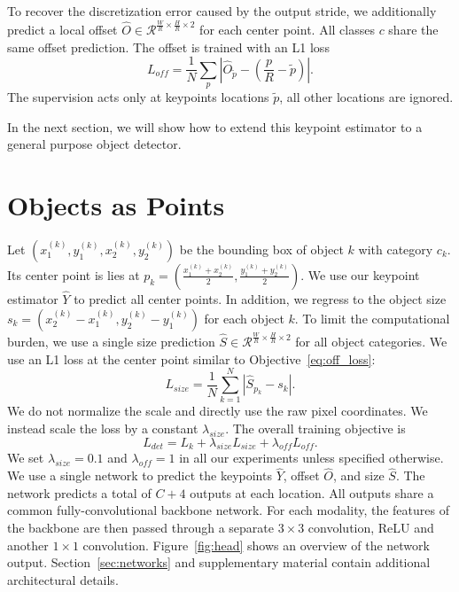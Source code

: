 \documentclass[10pt,twocolumn,letterpaper]{article}
\begin{document}
To recover the discretization error caused by the output stride, we additionally predict a local offset $\hat O \in \mathcal{R}^{\frac{W}{R} \times \frac{H}{R} \times 2}$ for each center point.
All classes $c$ share the same offset prediction.
The offset is trained with an L1 loss
\begin{equation}
    L_{off} = \frac{1}{N}\sum_{p} \left|\hat O_{\tilde p} - \left(\frac{p}{R} - \tilde p\right)\right|\label{eq:off_loss}.
\end{equation}
The supervision acts only at keypoints locations $\tilde p$, all other locations are ignored.

In the next section, we will show how to extend this keypoint estimator to a general purpose object detector.

\section{Objects as Points}
\label{sec:technic}
Let $(x_1^{(k)}, y_1^{(k)}, x_2^{(k)}, y_2^{(k)})$ be the bounding box of object $k$ with category $c_k$.
Its center point is lies at $p_k = (\frac{x_1^{(k)} + x_2^{(k)}}{2}, \frac{y_1^{(k)} + y_2^{(k)}}{2})$.
We use our keypoint estimator $\hat Y$ to predict all center points.
In addition, we regress to the object size $s_k = (x_2^{(k)} - x_1^{(k)}, y_2^{(k)} - y_1^{(k)})$ for each object $k$.
To limit the computational burden, we use a single size prediction $\hat S  \in \mathcal{R}^{\frac{W}{R} \times \frac{H}{R} \times 2}$ for all object categories.
We use an L1 loss at the center point similar to Objective~\ref{eq:off_loss}:
\begin{equation}
    L_{size} = \frac{1}{N}\sum_{k=1}^{N} \left|\hat S_{p_k} - s_k\right|.
\label{eq:size_loss}
\end{equation}
We do not normalize the scale and directly use the raw pixel coordinates.
We instead scale the loss by a constant $\lambda_{size}$.
The overall training objective is
\begin{equation}
    L_{det} = L_{k} + \lambda_{size} L_{size} + \lambda_{off}L_{off}.
\label{eq:total_loss}
\end{equation}
We set $\lambda_{size} = 0.1$ and $ \lambda_{off} = 1$ in all our experiments unless specified otherwise.
We use a single network to predict the keypoints $\hat Y$, offset $\hat O$, and size $\hat S$.
The network predicts a total of $C + 4$ outputs at each location.
All outputs share a common fully-convolutional backbone network.
For each modality, the features of the backbone are then passed through a separate $3 \times 3$ convolution, ReLU and another $1 \times 1$ convolution.
Figure~\ref{fig:head} shows an overview of the network output.
Section~\ref{sec:networks} and supplementary material contain additional architectural details.
\end{document}
